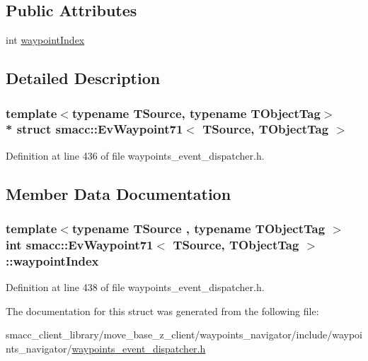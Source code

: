 \subsection*{Public Attributes}
\begin{DoxyCompactItemize}
\item 
int \hyperlink{structsmacc_1_1EvWaypoint71_a3ac70b68e59d688a42de2ebcb4cf514b}{waypoint\+Index}
\end{DoxyCompactItemize}


\subsection{Detailed Description}
\subsubsection*{template$<$typename T\+Source, typename T\+Object\+Tag$>$\\*
struct smacc\+::\+Ev\+Waypoint71$<$ T\+Source, T\+Object\+Tag $>$}



Definition at line 436 of file waypoints\+\_\+event\+\_\+dispatcher.\+h.



\subsection{Member Data Documentation}
\subsubsection[{\texorpdfstring{waypoint\+Index}{waypointIndex}}]{\setlength{\rightskip}{0pt plus 5cm}template$<$typename T\+Source , typename T\+Object\+Tag $>$ int {\bf smacc\+::\+Ev\+Waypoint71}$<$ T\+Source, T\+Object\+Tag $>$\+::waypoint\+Index}\hypertarget{structsmacc_1_1EvWaypoint71_a3ac70b68e59d688a42de2ebcb4cf514b}{}\label{structsmacc_1_1EvWaypoint71_a3ac70b68e59d688a42de2ebcb4cf514b}


Definition at line 438 of file waypoints\+\_\+event\+\_\+dispatcher.\+h.



The documentation for this struct was generated from the following file\+:\begin{DoxyCompactItemize}
\item 
smacc\+\_\+client\+\_\+library/move\+\_\+base\+\_\+z\+\_\+client/waypoints\+\_\+navigator/include/waypoints\+\_\+navigator/\hyperlink{waypoints__event__dispatcher_8h}{waypoints\+\_\+event\+\_\+dispatcher.\+h}\end{DoxyCompactItemize}
